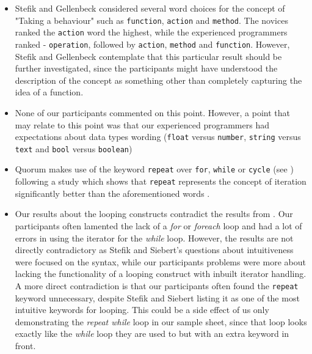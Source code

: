 \documentclass[preprint,10pt]{sigplanconf}
\begin{document}
\begin{itemize}
\item Stefik and Gellenbeck considered several word choices for the concept of "Taking a behaviour" such as \lstinline!function!, \lstinline!action! and \lstinline!method!. The novices ranked the \lstinline!action! word the highest, while the experienced programmers ranked - \lstinline!operation!, followed by \lstinline!action!, \lstinline!method! and \lstinline!function!. However, Stefik and Gellenbeck contemplate that this particular result should be further investigated, since the participants might have understood the description of the concept as something other than completely capturing the idea of a function.

\item None of our participants commented on this point. However, a point that may relate to this point was that our experienced programmers had expectations about data types wording (\lstinline!float! versus \lstinline!number!, \lstinline!string! versus \lstinline!text! and \lstinline!bool! versus \lstinline!boolean!)

\item Quorum makes use of the keyword \lstinline!repeat! over \lstinline!for!, \lstinline!while! or \lstinline!cycle! (see %
\cite{SanchezData}) following a study which shows that \lstinline!repeat! represents the concept of iteration significantly better than the aforementioned words \cite{EmpStudiesonStimuli}.

\item Our results about the looping constructs contradict the results from \cite{Empiricalinvestigation}. Our participants often lamented the lack of a \textit{for} or \textit{foreach} loop and had a lot of errors in using the iterator for the \textit{while} loop. %
However, the results are not directly contradictory as Stefik and Siebert's questions about intuitiveness were focused on the syntax, while our participants problems were more about lacking the functionality of a looping construct with inbuilt iterator handling. A more direct contradiction is that our participants often found the \lstinline!repeat! keyword unnecessary, despite Stefik and Siebert listing it as one of the most intuitive keywords for looping. This could be a side effect of us only demonstrating the \textit{repeat while} loop in our sample sheet, since that loop looks exactly like the \textit{while} loop they are used to but with an extra keyword in front. 
\end{itemize}
\end{document}
